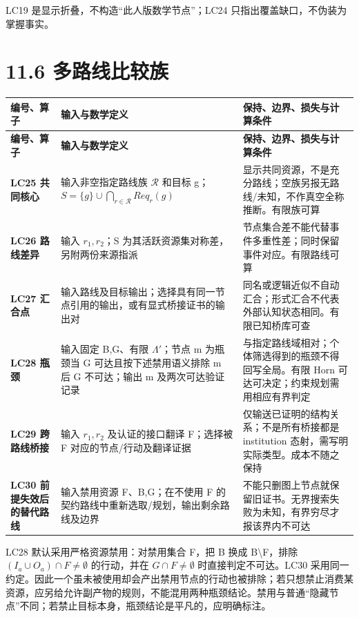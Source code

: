 \documentclass[UTF8,a4paper,zihao=-4,fontset=windows,openany]{ctexbook}
\def\mathrm#1{#1}%
\begin{document}
LC19 是显示折叠，不构造“此人版数学节点”；LC24 只指出覆盖缺口，不伪装为掌握事实。

\section{11.6 多路线比较族}
\begingroup\small\setlength{\tabcolsep}{4pt}
\begin{longtable}{>{\raggedright\arraybackslash}p{}>{\raggedright\arraybackslash}p{}>{\raggedright\arraybackslash}p{}}
\toprule
\textbf{编号、算子} & \textbf{输入与数学定义} & \textbf{保持、边界、损失与计算条件} \\
\midrule
\endfirsthead
\toprule
\textbf{编号、算子} & \textbf{输入与数学定义} & \textbf{保持、边界、损失与计算条件} \\
\midrule
\endhead
\bottomrule
\endfoot
\bottomrule
\endlastfoot
\textbf{LC25 共同核心} & 输入非空指定路线族 \(\mathcal{R}\) 和目标 g；\(S=\{g\}\cup\bigcap_{r\in\mathcal{R}}\mathrm{Req}_r(g)\) & 显示共同资源，不是充分路线；空族另报无路线/未知，不作真空全称推断。有限族可算 \\
\textbf{LC26 路线差异} & 输入 \(r_{1},r_{2}\)；S 为其活跃资源集对称差，另附两份来源指派 & 节点集合差不能代替事件多重性差；同时保留事件对应。有限路线可算 \\
\textbf{LC27 汇合点} & 输入路线及目标输出；选择具有同一节点引用的输出，或有显式桥接证书的输出对 & 同名或逻辑近似不自动汇合；形式汇合不代表外部认知状态相同。有限已知桥库可查 \\
\textbf{LC28 瓶颈} & 输入固定 B,G、有限 \(\Lambda'\)；节点 m 为瓶颈当 G 可达且按下述禁用语义排除 m 后 G 不可达；输出 m 及两次可达验证记录 & 与指定路线域相对；个体筛选得到的瓶颈不得回写全局。有限 Horn 可达可决定；约束规划需用相应有界判定 \\
\textbf{LC29 跨路线桥接} & 输入 \(r_{1},r_{2}\) 及认证的接口翻译 F；选择被 F 对应的节点/行动及翻译证据 & 仅输送已证明的结构关系；不是所有桥接都是 institution 态射，需写明实际类型。成本不随之保持 \\
\textbf{LC30 前提失效后的替代路线} & 输入禁用资源 F、B,G；在不使用 F 的契约路线中重新选取/规划，输出剩余路线及边界 & 不能只删图上节点就保留旧证书。无界搜索失败为未知，有界穷尽才报该界内不可达 \\
\end{longtable}
\endgroup

LC28 默认采用严格资源禁用：对禁用集合 F，把 B 换成 B\textbackslash{}F，排除 \((I_a\cup O_a)\cap F\ne\emptyset\) 的行动，并在 \(G\cap F\ne\emptyset\) 时直接判定不可达。LC30 采用同一约定。因此一个虽未被使用却会产出禁用节点的行动也被排除；若只想禁止消费某资源，应另给允许副产物的规则，不能混用两种瓶颈结论。禁用与普通“隐藏节点”不同；若禁止目标本身，瓶颈结论是平凡的，应明确标注。
\end{document}
